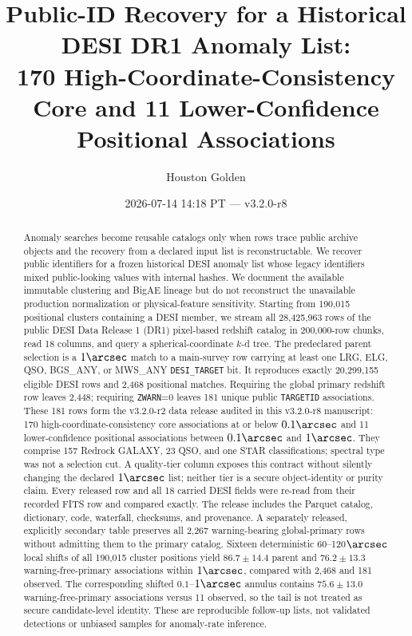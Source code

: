 \documentclass[twocolumn]{aastex701}
\newcommand{\paperVersion}{v3.2.0-r8}
\newcommand{\paperTimestamp}{2026-07-14 14:18 PT}
\newcommand{\releaseVersion}{v3.2.0-r2}
\begin{document}
\title{Public-ID Recovery for a Historical DESI DR1 Anomaly List:\\
170 High-Coordinate-Consistency Core and 11 Lower-Confidence Positional Associations}

\author{Houston Golden}
\date{\paperTimestamp{} --- \paperVersion}

\begin{abstract}
Anomaly searches become reusable catalogs only when rows trace public archive objects and the
recovery from a declared input list is reconstructable.  We recover public identifiers for a
frozen historical DESI anomaly list whose legacy identifiers mixed public-looking values with
internal hashes.  We document the available immutable clustering and BigAE lineage but do not
reconstruct the unavailable production normalization or physical-feature sensitivity.  Starting
from 190,015 positional clusters containing a DESI member, we stream all 28,425,963 rows of the
public DESI Data Release 1 (DR1) pixel-based redshift catalog in 200,000-row chunks, read 18
columns, and query a spherical-coordinate $k$-d tree.  The predeclared parent selection is a
$1\arcsec$ match to a main-survey row carrying at least one LRG, ELG, QSO, BGS\_ANY, or MWS\_ANY
\texttt{DESI\_TARGET} bit.  It reproduces exactly 20,299,155 eligible DESI rows and 2,468
positional matches.  Requiring the global primary redshift row leaves 2,448; requiring
\texttt{ZWARN}=0 leaves 181 unique public \texttt{TARGETID} associations.  These 181 rows form the
\releaseVersion{} data release audited in this \paperVersion{} manuscript: 170 high-coordinate-consistency
core associations at or below $0.1\arcsec$ and 11 lower-confidence positional associations between
$0.1\arcsec$ and $1\arcsec$.  They comprise 157
Redrock GALAXY, 23 QSO, and one STAR classifications; spectral type
was not a selection cut.  A quality-tier column exposes this contract without silently changing
the declared $1\arcsec$ list; neither tier is a secure object-identity or purity claim.  Every
released row and all 18 carried DESI
fields were re-read from their recorded FITS row and compared exactly.  The release includes the
Parquet catalog, dictionary, code, waterfall, checksums, and provenance.  A separately released,
explicitly secondary table preserves all 2,267 warning-bearing global-primary rows without
admitting them to the primary catalog.  Sixteen deterministic 60--120$\arcsec$ local shifts of
all 190,015 cluster positions yield $86.7\pm14.4$ parent and $76.2\pm13.3$ warning-free-primary
associations within $1\arcsec$, compared with 2,468 and 181 observed.  The corresponding shifted
$0.1$--$1\arcsec$ annulus contains $75.6\pm13.0$ warning-free-primary associations versus 11
observed, so the tail is not treated as secure candidate-level identity.  These are reproducible
follow-up lists, not validated detections or unbiased samples for anomaly-rate inference.
\end{abstract}
\end{document}
